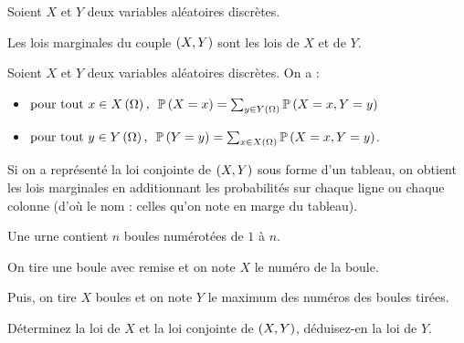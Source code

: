 \begin{defi}
Soient \(X\) et \(Y\) deux variables aléatoires discrètes.

Les lois marginales du couple \(\left(X,Y\right)\) sont les lois de \(X\) et de \(Y\).
\end{defi}

\begin{prop}
Soient \(X\) et \(Y\) deux variables aléatoires discrètes. On a :

\begin{itemize}
    \item \(\quantifs{\tpt x\in X\paren{\Omega}}\proba{X=x}=\sum_{y\in Y\paren{\Omega}}\proba{X=x,Y=y}\) \\
    \item \(\quantifs{\tpt y\in Y\paren{\Omega}}\proba{Y=y}=\sum_{x\in X\paren{\Omega}}\proba{X=x,Y=y}\).
\end{itemize}
\end{prop}

Si on a représenté la loi conjointe de \(\left(X,Y\right)\) sous forme d'un tableau, on obtient les lois marginales en additionnant les probabilités sur chaque ligne ou chaque colonne (d'où le nom  : celles qu'on note en marge du tableau).

\begin{exo}
Une urne contient \(n\) boules numérotées de \(1\) à \(n\).

On tire une boule avec remise et on note \(X\) le numéro de la boule.

Puis, on tire \(X\) boules et on note \(Y\) le maximum des numéros des boules tirées.

Déterminez la loi de \(X\) et la loi conjointe de \(\left(X,Y\right)\), déduisez-en la loi de \(Y\).
\end{exo}

